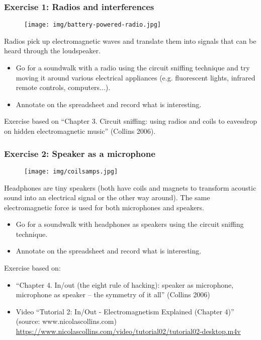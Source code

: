 \documentclass[screen, aspectratio=43]{beamer}
\begin{document}
\begin{frame}
  \frametitle{Exercise 1: Radios and interferences}
   \begin{figure}
	\texttt{[image: img/battery-powered-radio.jpg]}
\end{figure}
{\scriptsize 
Radios pick up electromagnetic waves and translate them into signals that can be heard through the loudspeaker.
    \begin{itemize}
	\item Go for a soundwalk with a radio using the circuit sniffing technique and try moving it around various electrical appliances (e.g. fluorescent lights, infrared remote controls, computers...).
	\item Annotate on the spreadsheet and record what is interesting.
    \end{itemize}   
}    
{\tiny
Exercise based on ``Chapter 3. Circuit sniffing: using radios and coils to eavesdrop on hidden electromagnetic music'' (Collins 2006).
}
\end{frame}
%
\begin{frame}
  \frametitle{Exercise 2: Speaker as a microphone}
 \begin{figure}
	\texttt{[image: img/coilsamps.jpg]}
\end{figure}
{\scriptsize 
Headphones are tiny speakers (both have coils and magnets to transform acoustic sound into an electrical signal or the other way around). The same electromagnetic force is used for both microphones and speakers.
    \begin{itemize}
	\item Go for a soundwalk with headphones as speakers using the circuit sniffing technique.    
	\item Annotate on the spreadsheet and record what is interesting.
    \end{itemize}
 }   
    {\tiny Exercise based on:
     \begin{itemize}
    	\item ``Chapter 4. In/out (the eight rule of hacking): speaker as microphone, microphone as speaker -- the symmetry of it all'' (Collins 2006)
	\item Video ``Tutorial 2: In/Out - Electromagnetism Explained (Chapter 4)'' (source: www.nicolascollins.com)\\ 
	\url{https://www.nicolascollins.com/video/tutorial02/tutorial02-desktop.m4v} 
      \end{itemize}	
    }
       
\end{frame}
\end{document}
